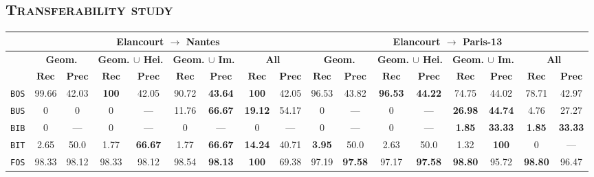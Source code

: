     \subsection{\textsc{Transferability study}}
        \begin{sidewaystable}
            \footnotesize
            \begin{center}
                \begin{tabular}{|c | c c | c c | c c | c c || c c | c c | c c | c c |}
                    \hline
                    & \multicolumn{8}{c||}{\textbf{Elancourt $\rightarrow$ Nantes}} & \multicolumn{8}{c|}{\textbf{Elancourt $\rightarrow$ Paris-13}}\\
                    \hline
                    &\multicolumn{2}{c|}{\textbf{Geom.}} & \multicolumn{2}{c|}{\textbf{Geom. $\cup$ Hei.}} & \multicolumn{2}{c|}{\textbf{Geom. $\cup$ Im.}} & \multicolumn{2}{c||}{\textbf{All}} & \multicolumn{2}{c|}{\textbf{Geom.}} & \multicolumn{2}{c|}{\textbf{Geom. $\cup$ Hei.}} & \multicolumn{2}{c|}{\textbf{Geom. $\cup$ Im.}} & \multicolumn{2}{x{1.5cm}|}{\textbf{All}}\\
                    \cline{2-17}
                    & \(\bm{Rec}\) & \(\bm{Prec}\) &  \(\bm{Rec}\) & \(\bm{Prec}\) &  \(\bm{Rec}\) & \(\bm{Prec}\) &  \(\bm{Rec}\) & \(\bm{Prec}\) & \(\bm{Rec}\) & \(\bm{Prec}\) &  \(\bm{Rec}\) & \(\bm{Prec}\) &  \(\bm{Rec}\) & \(\bm{Prec}\) &  \(\bm{Rec}\) & \(\bm{Prec}\) \\
                    \hline
                    \texttt{BOS} & 99.66 & 42.03 & \textbf{100} & 42.05 & 90.72 & \textbf{43.64} & \textbf{100} & 42.05 & 96.53 & 43.82 & \textbf{96.53} & \textbf{44.22} & 74.75 & 44.02 & 78.71 & 42.97 \\
                    \hline
                    \texttt{BUS} & 0 & 0 & 0 & --- & 11.76 & \textbf{66.67} & \textbf{19.12} & 54.17 & 0 & --- & 0 & --- & \textbf{26.98} & \textbf{44.74} & 4.76 & 27.27 \\
                    \hline
                    \texttt{BIB} & 0 & --- & 0 & --- & 0 & --- & 0 & --- & 0 & --- & 0 & --- & \textbf{1.85} & \textbf{33.33} & \textbf{1.85} & \textbf{33.33} \\
                    \hline
                    \texttt{BIT} & 2.65 & 50.0 & 1.77 & \textbf{66.67} & 1.77 & \textbf{66.67} & \textbf{14.24} & 40.71 & \textbf{3.95} & 50.0 & 2.63 & 50.0 & 1.32 & \textbf{100} & 0 & --- \\
                    \hline
                    \texttt{FOS} & 98.33 & 98.12 & 98.33 & 98.12 & 98.54 & \textbf{98.13} & \textbf{100} & 69.38 & 97.19 & \textbf{97.58} & 97.17 & \textbf{97.58} & \textbf{98.80} & 95.72 & \textbf{98.80} & 96.47 \\

\end{tabular}
\end{center}
\end{sidewaystable}
